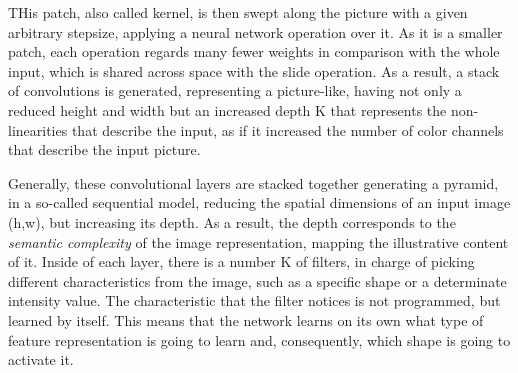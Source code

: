 THis patch, also called kernel, is then swept along the picture with a given arbitrary stepsize, applying a neural network operation over it. As it is a smaller patch, each operation regards many fewer weights in comparison with the whole input, which is shared across space with the slide operation. As a result, a stack of convolutions is generated, representing a picture-like, having not only a reduced height and width but an increased depth K that represents the non-linearities that describe the input, as if it increased the number of color channels that describe the input picture.

Generally, these convolutional layers are stacked together generating a pyramid, in a so-called sequential model, reducing the spatial dimensions of an input image (h,w), but increasing its depth. As a result, the depth corresponds to the \emph{semantic complexity} of the image representation, mapping the illustrative content of it. Inside of each layer, there is a number K of filters, in charge of picking different characteristics from the image, such as a specific shape or a determinate intensity value. The characteristic that the filter notices is not programmed, but learned by itself. This means that the network learns on its own what type of feature representation is going to learn and, consequently, which shape is going to activate it.


